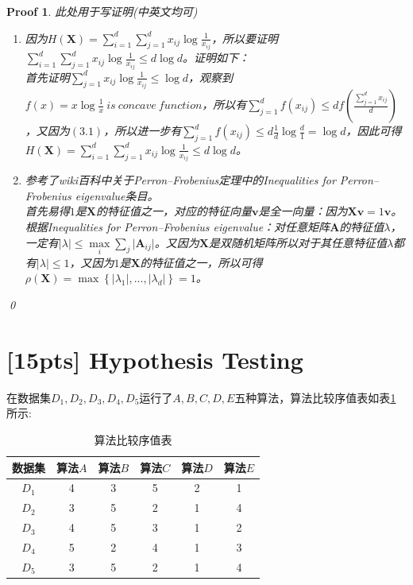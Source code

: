 \documentclass[a4paper,UTF8]{article}
\numberwithin{equation}{section}
\newtheorem*{myProof}{Proof}
\begin{document}
\begin{myProof}
此处用于写证明(中英文均可)

\begin{enumerate}
\item 
因为$H(\mathbf{X})=\sum_{i=1}^{d}\sum_{j=1}^{d}x_{ij}\log \frac{1}{x_{ij}}$，所以要证明$\sum_{i=1}^{d}\sum_{j=1}^{d}x_{ij}\log \frac{1}{x_{ij}} \leq d\log d$。证明如下：\\
首先证明$\sum_{j=1}^{d}x_{ij}\log\frac{1}{x_{ij}}\leq \log d$，观察到$f(x) = x\log \frac{1}{x}\ is\ concave\ function$，所以有$\sum_{j=1}^{d}f(x_{ij}) \leq df(\frac{\sum_{j=1}^{d}x_{ij}}{d})$，又因为$(3.1)$，所以进一步有$\sum_{j=1}^{d}f(x_{ij}) \leq d\frac{1}{d}\log \frac{d}{1} = \log d$，因此可得$H(\mathbf{X})=\sum_{i=1}^{d}\sum_{j=1}^{d}x_{ij}\log \frac{1}{x_{ij}} \leq d\log d$。

\item 
参考了wiki百科中关于Perron–Frobenius定理中的Inequalities for Perron–Frobenius eigenvalue条目。\\
首先易得$1$是$\mathbf{X}$的特征值之一，对应的特征向量$\mathbf{v}$是全一向量：因为$\mathbf{X}\mathbf{v} = 1\mathbf{v}$。\\
根据Inequalities for Perron–Frobenius eigenvalue：对任意矩阵$\mathbf{A}$的特征值$\lambda$，一定有$\vert\lambda\vert\leq\max\limits_{i}\sum_{j}\vert\mathbf{A}_{ij}\vert$。又因为$\mathbf{X}$是双随机矩阵所以对于其任意特征值$\lambda$都有$\vert\lambda\vert\leq 1$，又因为$1$是$\mathbf{X}$的特征值之一，所以可得$\rho(\mathbf{X}) = \max\left\{|\lambda_1|,...,|\lambda_d|\right\} = 1$。
\end{enumerate}

\qed
\end{myProof}
\newpage
\section{[15pts] Hypothesis Testing} 
在数据集$D_1,D_2,D_3,D_4,D_5$运行了$A,B,C,D,E$五种算法，算法比较序值表如表\ref{table:ranking}所示:
\begin{table}[h]
\centering
\caption{算法比较序值表} \vspace{2mm}
\label{table:ranking}
\begin{tabular}{c|c c c c c}\hline
数据集 		& 算法$A$  	&算法$B$  	& 算法$C$ 	& 算法$D$  	&算法$E$ 	\\ \hline
$D_1$ 		& 4 		&  3  		& 5  		&  2 		& 1			\\
$D_2$ 		& 3 		&  5  		& 2  		&  1 		& 4			\\
$D_3$ 		& 4 		&  5  		& 3  		&  1 		& 2			\\ 
$D_4$ 		& 5 		&  2  		& 4  		&  1 		& 3			\\ 
$D_5$ 		& 3 		&  5  		& 2  		&  1 		& 4			\\ \hline
\end{tabular}
\end{table}
\end{document}
